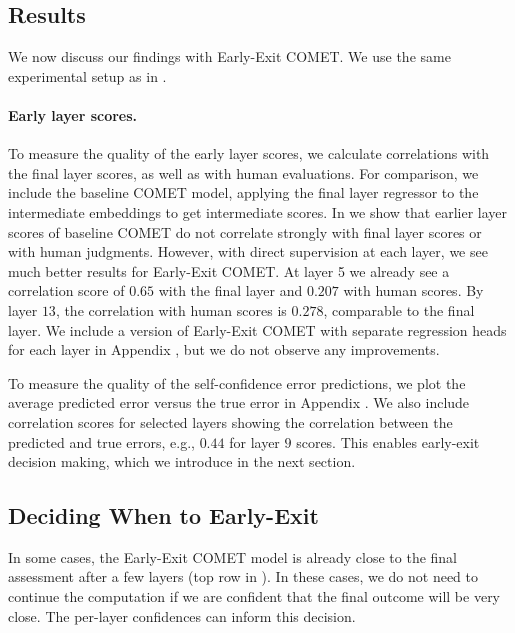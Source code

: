 \subsection{Results}

We now discuss our findings with Early-Exit COMET.
We use the same experimental setup as in .

\paragraph{Early layer scores.}
To measure the quality of the early layer scores, we calculate correlations with the final layer scores, as well as with human evaluations.
For comparison, we include the baseline COMET model, applying the final layer regressor to the intermediate embeddings to get intermediate scores.
In  we show that earlier layer scores of baseline COMET do not correlate strongly with final layer scores or with human judgments. 
However, with direct supervision at each layer, we see much better results for Early-Exit COMET.
At layer 5 we already see a correlation score of $0.65$ with the final layer and $0.207$ with human scores. By layer $13$, the correlation with human scores is $0.278$, comparable to the final layer.
We include a version of Early-Exit COMET with separate regression heads for each layer in Appendix , but we do not observe any improvements.


To measure the quality of the self-confidence error predictions, we plot the average predicted error versus the true error in Appendix . We also include correlation scores for selected layers showing the correlation between the predicted and true errors, e.g., $0.44$ for layer $9$ scores.
This enables early-exit decision making, which we introduce in the next section.


\subsection{Deciding When to Early-Exit}
\label{sec:faster_segment_qe}


In some cases, the Early-Exit COMET model is already close to the final assessment after a few layers (top row in ).
In these cases, we do not need to continue the computation if we are confident that the final outcome will be very close.
The per-layer confidences can inform this decision.

